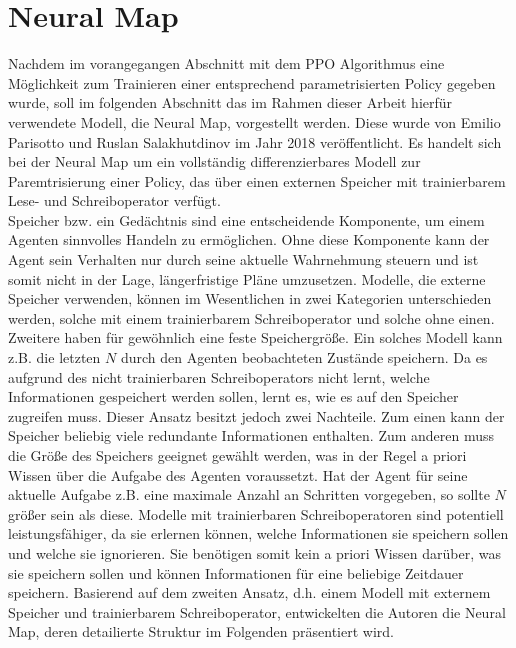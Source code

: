 \section{Neural Map}

Nachdem im vorangegangen Abschnitt mit dem \ac{PPO} Algorithmus eine Möglichkeit zum Trainieren einer entsprechend parametrisierten Policy gegeben wurde, soll im folgenden Abschnitt das im Rahmen dieser Arbeit hierfür verwendete Modell, die Neural Map, vorgestellt werden. Diese wurde von Emilio Parisotto und Ruslan Salakhutdinov im Jahr 2018 veröffentlicht. Es handelt sich bei der Neural Map um ein vollständig differenzierbares Modell zur Paremtrisierung einer Policy, das über einen externen Speicher mit trainierbarem Lese- und Schreiboperator verfügt. \\

Speicher bzw. ein Gedächtnis sind eine entscheidende Komponente, um einem Agenten sinnvolles Handeln zu ermöglichen. Ohne diese Komponente kann der Agent sein Verhalten nur durch seine aktuelle Wahrnehmung steuern und ist somit nicht in der Lage, längerfristige Pläne umzusetzen. Modelle, die externe Speicher verwenden, können im Wesentlichen in zwei Kategorien unterschieden werden, solche mit einem trainierbarem Schreiboperator und solche ohne einen. Zweitere haben für gewöhnlich eine feste Speichergröße. Ein solches Modell kann z.B. die letzten $N$ durch den Agenten beobachteten Zustände speichern. Da es aufgrund des nicht trainierbaren Schreiboperators nicht lernt, welche Informationen gespeichert werden sollen, lernt es, wie es auf den Speicher zugreifen muss. Dieser Ansatz besitzt jedoch zwei Nachteile. Zum einen kann der Speicher beliebig viele redundante Informationen enthalten. Zum anderen muss die Größe des Speichers geeignet gewählt werden, was in der Regel a priori Wissen über die Aufgabe des Agenten voraussetzt. Hat der Agent für seine aktuelle Aufgabe z.B. eine maximale Anzahl an Schritten vorgegeben, so sollte $N$ größer sein als diese. Modelle mit trainierbaren Schreiboperatoren sind potentiell leistungsfähiger, da sie erlernen können, welche Informationen sie speichern sollen und welche sie ignorieren. Sie benötigen somit kein a priori Wissen darüber, was sie speichern sollen und können Informationen für eine beliebige Zeitdauer speichern. Basierend auf dem zweiten Ansatz, d.h. einem Modell mit externem Speicher und trainierbarem Schreiboperator, entwickelten die Autoren die Neural Map, deren detailierte Struktur im Folgenden präsentiert wird. \\

